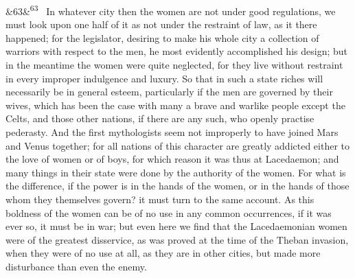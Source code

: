 \documentclass[12pt]{article}
\newcommand{\para}[1][]{\par\noindent\ifx&#1&\else\textsuperscript{\footnotesize #1}~\fi}
\begin{document}
\para[63] In whatever city then the women are not under good regulations, we must look upon one half of it as not under the restraint of law, as it there happened; for the legislator, desiring to make his whole city a collection of warriors with respect to the men, he most evidently accomplished his design; but in the meantime the women were quite neglected, for they live without restraint in every improper indulgence and luxury. So that in such a state riches will necessarily be in general esteem, particularly if the men are governed by their wives, which has been the case with many a brave and warlike people except the Celts, and those other nations, if there are any such, who openly practise pederasty. And the first mythologists seem not improperly to have joined Mars and Venus together; for all nations of this character are greatly addicted either to the love of women or of boys, for which reason it was thus at Lacedaemon; and many things in their state were done by the authority of the women. For what is the difference, if the power is in the hands of the women, or in the hands of those whom they themselves govern? it must turn to the same account. As this boldness of the women can be of no use in any common occurrences, if it was ever so, it must be in war; but even here we find that the Lacedaemonian women were of the greatest disservice, as was proved at the time of the Theban invasion, when they were of no use at all, as they are in other cities, but made more disturbance than even the enemy.
\end{document}
